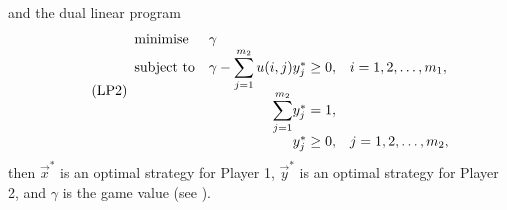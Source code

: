     and the dual linear program
    \begin{equation} \label{lp:player2-program}
    \tag{LP2}
        \begin{array}{lr@{}ll}
            \text{minimise} & \multicolumn{1}{l}{\gamma} & & \\
            \text{subject to} & \gamma - \displaystyle\sum\limits_{j = 1}^{m_2} u(i, j) & y^*_j \ge 0, & i = 1, 2, \ldots, m_1, \\
             & \displaystyle\sum\limits_{j = 1}^{m_2} & y^*_j = 1, & \\
             & & y^*_j \ge 0, & j = 1, 2, \ldots, m_2, \\
        \end{array}
    \end{equation}
    then $\vec{x}^*$ is an optimal strategy for Player 1, $\vec{y}^*$ is an optimal strategy for Player 2, and $\gamma$ is the game value
    (see \parencite[Chapter 3]{Owen2013}).



